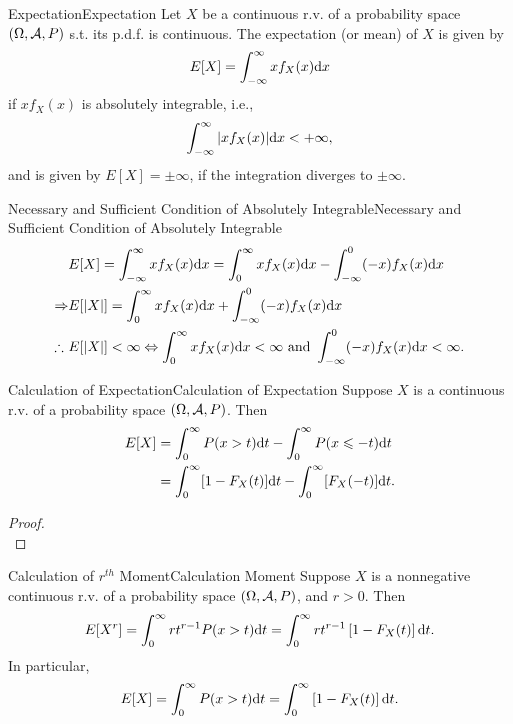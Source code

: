 \documentclass{elegantbook}
\begin{document}
\begin{definition}{Expectation}{Expectation}
Let $X$ be a continuous r.v. of a probability space $(\Omega,\mathcal{A}, P)$ s.t. its p.d.f. is continuous. The expectation (or mean) of $X$ is given by
$$
E[X]=\int_{-\infty}^{\infty}xf_X(x)\dif x
$$
if $xf_X(x)$ is absolutely integrable, i.e.,
$$
\int_{-\infty}^{\infty}{|xf_X(x)|\dif x}<+\infty,
$$
and is given by $E[X]=\pm\infty$, if the integration diverges to $\pm\infty$.
\end{definition}

\begin{remark}{Necessary and Suf\/f\/icient Condition of Absolutely Integrable}{Necessary and Sufficient Condition of Absolutely Integrable}
$$\begin{aligned}
&E[X]=\int_{-\infty}^{\infty}xf_X(x)\dif x=\int_{0}^{\infty}xf_X(x)\dif x-\int_{-\infty}^{0}(-x)f_X(x)\dif x\\
\Rightarrow &E[|X|]=\int_{0}^{\infty}xf_X(x)\dif x+\int_{-\infty}^{0}(-x)f_X(x)\dif x\\
\therefore\ &E[|X|]<\infty\Leftrightarrow \int_{0}^{\infty}xf_X(x)\dif x<\infty  \text{ and } \int_{-\infty}^{0}(-x)f_X(x)\dif x<\infty.
\end{aligned}$$
\end{remark}

\begin{theorem}{Calculation of Expectation}{Calculation of Expectation}
Suppose $X$ is a continuous r.v. of a probability space $(\Omega,\mathcal{A}, P)$.
Then
$$\begin{aligned}
E[X]&=\int_{0}^{\infty}P(x>t)\dif t-\int_{0}^{\infty}P(x\ls-t)\dif t\\
&=\int_{0}^{\infty}[1-F_X(t)]\dif t-\int_{0}^{\infty}[F_X(-t)]\dif t.
\end{aligned}$$
\end{theorem}

\begin{proof}
\\[4cm]\vspace{0.01cm}
\end{proof}

\begin{corollary}{Calculation of $r^{th}$ Moment}{Calculation Moment}
Suppose $X$ is a nonnegative continuous r.v. of a probability space $(\Omega,\mathcal{A}, P)$, and $r>0.$ Then
$$
E\lbrack X^{r}\rbrack = \int_{0}^{\infty}{rt^{r - 1}}P(x > t)\dif t = \int_{0}^{\infty}{rt^{r - 1}}\left[ 1 - F_{X}( t ) \right]\dif t.
$$
In particular,
$$
E\lbrack X\rbrack = \int_{0}^{\infty}{P(x > t)}\dif t = \int_{0}^{\infty}\left[ 1 - F_{X}(t) \right]\dif t.
$$
\end{corollary}
\end{document}
